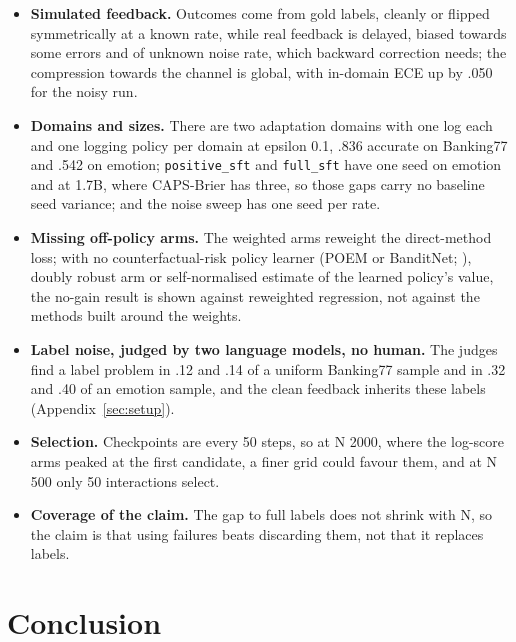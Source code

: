 \documentclass[10pt,letterpaper]{article}
\theoremstyle{plain}
\begin{document}
\begin{itemize}
  \item \textbf{Simulated feedback.} Outcomes come from gold labels, cleanly or flipped symmetrically at a known rate, while real feedback is delayed, biased towards some errors and of unknown noise rate, which backward correction needs; the compression towards the channel is global, with in-domain ECE up by .050 for the noisy run.
  \item \textbf{Domains and sizes.} There are two adaptation domains with one log each and one logging policy per domain at epsilon 0.1, .836 accurate on Banking77 and .542 on emotion; \texttt{positive\_sft} and \texttt{full\_sft} have one seed on emotion and at 1.7B, where CAPS-Brier has three, so those gaps carry no baseline seed variance; and the noise sweep has one seed per rate.
  \item \textbf{Missing off-policy arms.} The weighted arms reweight the direct-method loss; with no counterfactual-risk policy learner (POEM or BanditNet; \citealp{swaminathan2015crm,joachims2018banditnet}), doubly robust arm \citep{dudik2011doubly} or self-normalised estimate of the learned policy's value, the no-gain result is shown against reweighted regression, not against the methods built around the weights.
  \item \textbf{Label noise, judged by two language models, no human.} The judges find a label problem in .12 and .14 of a uniform Banking77 sample and in .32 and .40 of an emotion sample, and the clean feedback inherits these labels (Appendix~\ref{sec:setup}).
  \item \textbf{Selection.} Checkpoints are every 50 steps, so at N 2000, where the log-score arms peaked at the first candidate, a finer grid could favour them, and at N 500 only 50 interactions select.
  \item \textbf{Coverage of the claim.} The gap to full labels does not shrink with N, so the claim is that using failures beats discarding them, not that it replaces labels.
\end{itemize}

\section{Conclusion}\label{sec:6}
\end{document}
